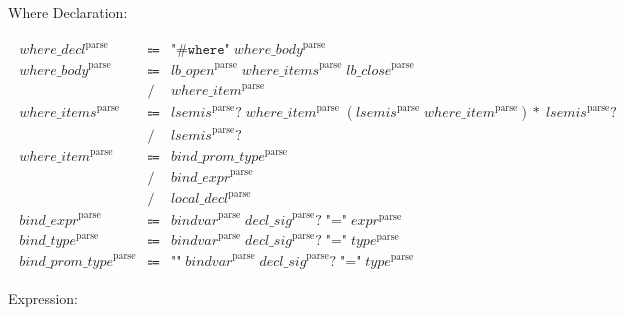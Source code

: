 Where Declaration:

\begin{align*}
    \begin{array}{rcll}
        \mathit{where\_decl}^\mathrm{parse}
        &\Coloneq &\texttt{"\#where"}\; \mathit{where\_body}^\mathrm{parse} \\
        \mathit{where\_body}^\mathrm{parse}
        &\Coloneq &\mathit{lb\_open}^\mathrm{parse}\; \mathit{where\_items}^\mathrm{parse}\; \mathit{lb\_close}^\mathrm{parse} \\
        &\mathrel{/} &\mathit{where\_item}^\mathrm{parse} \\
        \mathit{where\_items}^\mathrm{parse}
        &\Coloneq &\mathit{lsemis}^\mathrm{parse}{?}\; \mathit{where\_item}^\mathrm{parse}\; (\mathit{lsemis}^\mathrm{parse}\; \mathit{where\_item}^\mathrm{parse}){*}\; \mathit{lsemis}^\mathrm{parse}{?} \\
        &\mathrel{/} &\mathit{lsemis}^\mathrm{parse}{?} \\
        \mathit{where\_item}^\mathrm{parse}
        &\Coloneq &\mathit{bind\_prom\_type}^\mathrm{parse} \\
        &\mathrel{/} &\mathit{bind\_expr}^\mathrm{parse} \\
        &\mathrel{/} &\mathit{local\_decl}^\mathrm{parse} \\
        \mathit{bind\_expr}^\mathrm{parse}
        &\Coloneq &\mathit{bindvar}^\mathrm{parse}\; \mathit{decl\_sig}^\mathrm{parse}{?}\; \texttt{"="}\; \mathit{expr}^\mathrm{parse} \\
        \mathit{bind\_type}^\mathrm{parse}
        &\Coloneq &\mathit{bindvar}^\mathrm{parse}\; \mathit{decl\_sig}^\mathrm{parse}{?}\; \texttt{"="}\; \mathit{type}^\mathrm{parse} \\
        \mathit{bind\_prom\_type}^\mathrm{parse}
        &\Coloneq &\texttt{"\^{}"}\; \mathit{bindvar}^\mathrm{parse}\; \mathit{decl\_sig}^\mathrm{parse}{?}\; \texttt{"="}\; \mathit{type}^\mathrm{parse}
    \end{array}
\end{align*}

Expression:


